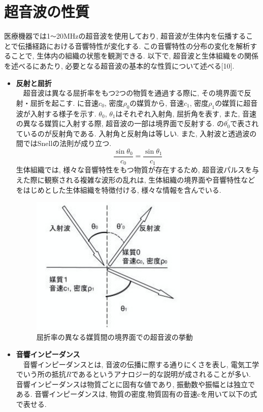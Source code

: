 \section{超音波の性質}
医療機器では1\verb|〜|20MHzの超音波を使用しており, 超音波が生体内を伝播することで伝播経路における音響特性が変化する. この音響特性の分布の変化を解析することで, 生体内の組織の状態を観測できる. 以下で, 超音波と生体組織をの関係を述べるにあたり, 必要となる超音波の基本的な性質について述べる[10].
\begin{itemize}
\item{\bf 反射と屈折}
\\\ \ 超音波は異なる屈折率をもつ2つの物質を通過する際に, その境界面で反射・屈折を起こす.  に音速$c_0$, 密度$\rho_0$の媒質から, 音速$c_1$, 密度$\rho_1$の媒質に超音波が入射する様子を示す. $\theta_0$, $\theta_1$はそれぞれ入射角, 屈折角を表す, また, 音速の異なる媒質に入射する際, 超音波の一部は境界面で反射する. の$\theta_0^{\prime}$で表されているのが反射角である. 入射角と反射角は等しい. また, 入射波と透過波の間ではSnellの法則が成り立つ.
\begin{equation}
 \frac{\sin\theta_0}{c_0} = \frac{\sin\theta_1}{c_1}
\end{equation}
生体組織では, 様々な音響特性をもつ物質が存在するため, 超音波パルスを与えた際に観察される複雑な波形の乱れは, 生体組織の境界面や音響特性などをはじめとした生体組織を特徴付ける, 様々な情報を含んでいる. 
\begin{figure}[H]
  \begin{center}
    \includegraphics[width=75mm]{fig/hansha.pdf}
  \end{center}
  \caption{屈折率の異なる媒質間の境界面での超音波の挙動}
\end{figure}
\item{\bf 音響インピーダンス}
\\\ \ 音響インピーダンスとは, 音波の伝播に際する通りにくさを表し, 電気工学でいう所の抵抗$R$であるというアナロジー的な説明が成されることが多い. 音響インピーダンスは物質ごとに固有な値であり, 振動数や振幅とは独立である. 音響インピーダンスは, 物質の密度,物質固有の音速cを用いて以下の式で表せる.

\end{itemize}

